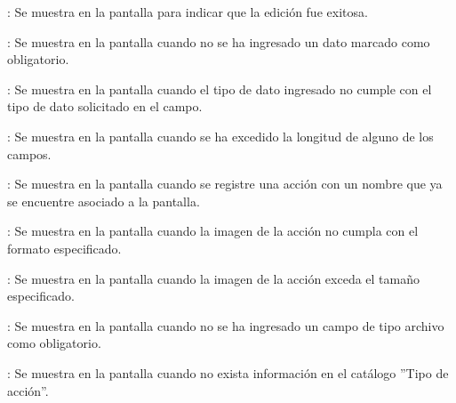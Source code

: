 \begin{Citemize}
	\item {}: Se muestra en la pantalla  para indicar que la edición fue exitosa.
	\item {}: Se muestra en la pantalla  cuando no se ha ingresado un dato marcado como obligatorio.
	\item {}: Se muestra en la pantalla  cuando el tipo de dato ingresado no cumple con el tipo de dato solicitado en el campo.
	\item {}: Se muestra en la pantalla  cuando se ha excedido la longitud de alguno de los campos.
	\item {}: Se muestra en la pantalla  cuando se registre una acción con un nombre que ya se encuentre asociado a la pantalla.
	\item {}: Se muestra en la pantalla  cuando la imagen de la acción no cumpla con el formato especificado.
	\item {}: Se muestra en la pantalla  cuando la imagen de la acción exceda el tamaño especificado.
	\item {}: Se muestra en la pantalla  cuando no se ha ingresado un campo de tipo archivo como obligatorio.
	\item {}: Se muestra en la pantalla  cuando no exista información en el catálogo ''Tipo de acción''.
\end{Citemize}
